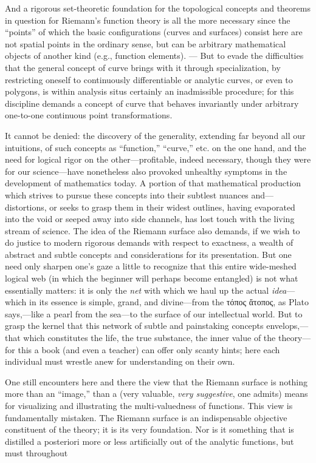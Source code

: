\documentclass{article}
\begin{document}
And a rigorous set-theoretic foundation for the topological concepts and theorems in question for Riemann's function theory is all the more necessary since the ``points'' of which the basic configurations (curves and surfaces) consist here are not spatial points in the ordinary sense, but can be arbitrary mathematical objects of another kind (e.g., function elements). --- But to evade the difficulties that the general concept of curve brings with it through specialization, by restricting oneself to continuously differentiable or analytic curves, or even to polygons, is within analysis situs certainly an inadmissible procedure; for this discipline demands a concept of curve that behaves invariantly under arbitrary one-to-one continuous point transformations.

It cannot be denied: the discovery of the generality, extending far beyond all our intuitions, of such concepts as ``function,'' ``curve,'' etc. on the one hand, and the need for logical rigor on the other---profitable, indeed necessary, though they were for our science---have nonetheless also provoked unhealthy symptoms in the development of mathematics today. A portion of that mathematical production which strives to pursue these concepts into their subtlest nuances and---distortions, or seeks to grasp them in their widest outlines, having evaporated into the void or seeped away into side channels, has lost touch with the living stream of science. The idea of the Riemann surface also demands, if we wish to do justice to modern rigorous demands with respect to exactness, a wealth of abstract and subtle concepts and considerations for its presentation. But one need only sharpen one's gaze a little to recognize that this entire wide-meshed logical web (in which the beginner will perhaps become entangled) is not what essentially matters: it is only the \emph{net} with which we haul up the actual \emph{idea}---which in its essence is simple, grand, and divine---from the τόπος ἄτοπος, as Plato says,---like a pearl from the sea---to the surface of our intellectual world. But to grasp the kernel that this network of subtle and painstaking concepts envelops,---that which constitutes the life, the true substance, the inner value of the theory---for this a book (and even a teacher) can offer only scanty hints; here each individual must wrestle anew for understanding on their own.

One still encounters here and there the view that the Riemann surface is nothing more than an ``image,'' than a (very valuable, \emph{very suggestive}, one admits) means for visualizing and illustrating the multi-valuedness of functions. This view is fundamentally mistaken. The Riemann surface is an indispensable objective constituent of the theory; it is its very foundation. Nor is it something that is distilled a posteriori more or less artificially out of the analytic functions, but must throughout
\end{document}
